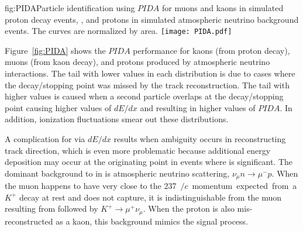 \begin{dunefigure}{fig:PIDA}{Particle identification using $PIDA$ for muons and kaons in simulated proton decay events, \ptoknubar, and protons in simulated atmospheric neutrino background events.  The curves are normalized by area.}
\texttt{[image: PIDA.pdf]}
\end{dunefigure}

Figure~\ref{fig:PIDA} shows the $PIDA$ performance for kaons (from proton decay), muons (from kaon decay), and protons produced by atmospheric neutrino interactions. The tail with lower values in each distribution is due to cases where the decay/stopping point was missed by the track reconstruction. The tail with higher values is caused when a second particle overlaps at the decay/stopping point causing higher values of $dE/dx$ and resulting in higher values of $PIDA$. In addition, ionization fluctuations smear out these distributions.

A complication for  via $dE/dx$ results when ambiguity occurs in reconstructing track direction, which is even more problematic because additional energy deposition may occur at the originating point in events where  is significant.  The dominant background to \ptoknubar in  is atmospheric neutrino  
scattering, $\nu_{\mu} n \rightarrow \mu^{-} p$.  When the muon happens to have very close
to the \SI{237}{\MeV$/c$} momentum expected from a $K^{+}$ decay at rest and does not capture, it is indistinguishable from the muon resulting from \ptoknubar followed by $K^{+} \rightarrow \mu^{+}\nu_{\mu}$. When
the proton is also mis-reconstructed as a kaon, this background mimics the signal process.  

